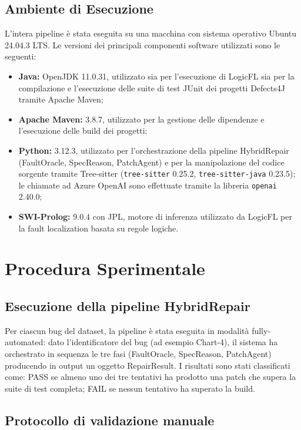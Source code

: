 \subsection{Ambiente di Esecuzione}

L'intera pipeline è stata eseguita su una macchina con sistema operativo Ubuntu 24.04.3 LTS.
Le versioni dei principali componenti software utilizzati sono le seguenti:

\begin{itemize}
    \item \textbf{Java:} OpenJDK 11.0.31, utilizzato sia per l'esecuzione di LogicFL sia per la compilazione e 
    l'esecuzione delle suite di test JUnit dei progetti Defects4J tramite Apache Maven;
    \item \textbf{Apache Maven:} 3.8.7, utilizzato per la gestione delle dipendenze e l'esecuzione delle build dei progetti;
    \item \textbf{Python:} 3.12.3, utilizzato per l'orchestrazione della pipeline HybridRepair (FaultOracle, SpecReason, PatchAgent) e per la manipolazione del codice sorgente tramite Tree-sitter (\texttt{tree-sitter} 0.25.2, \texttt{tree-sitter-java} 0.23.5); le chiamate ad Azure OpenAI sono effettuate tramite la libreria \texttt{openai} 2.40.0;
    \item \textbf{SWI-Prolog:} 9.0.4 con JPL, motore di inferenza utilizzato da LogicFL per la fault localization basata su regole logiche.
\end{itemize}

\section{Procedura Sperimentale}

\subsection{Esecuzione della pipeline HybridRepair}

Per ciascun bug del dataset, la pipeline è stata eseguita in modalità fully-automated: dato 
l'identificatore del bug (ad esempio Chart-4), il sistema ha orchestrato in sequenza le tre fasi 
(FaultOracle, SpecReason, PatchAgent) producendo in output un oggetto RepairResult. 
I risultati sono stati classificati come: PASS se almeno uno dei tre tentativi ha prodotto una patch 
che supera la suite di test completa; FAIL se nessun tentativo ha superato la build.

\subsection{Protocollo di validazione manuale}

